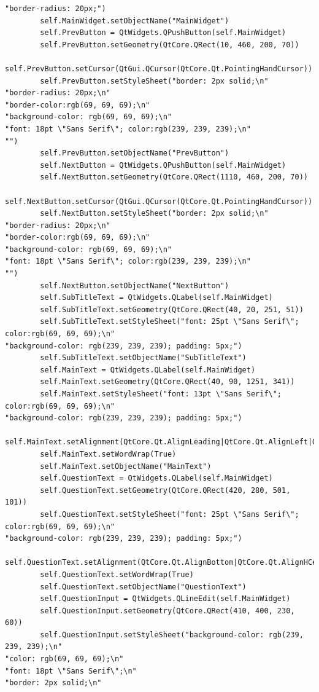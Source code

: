 \documentclass[12pt]{article}
\begin{document}
\begin{lstlisting}
"border-radius: 20px;")
        self.MainWidget.setObjectName("MainWidget")
        self.PrevButton = QtWidgets.QPushButton(self.MainWidget)
        self.PrevButton.setGeometry(QtCore.QRect(10, 460, 200, 70))
        self.PrevButton.setCursor(QtGui.QCursor(QtCore.Qt.PointingHandCursor))
        self.PrevButton.setStyleSheet("border: 2px solid;\n"
"border-radius: 20px;\n"
"border-color:rgb(69, 69, 69);\n"
"background-color: rgb(69, 69, 69);\n"
"font: 18pt \"Sans Serif\"; color:rgb(239, 239, 239);\n"
"")
        self.PrevButton.setObjectName("PrevButton")
        self.NextButton = QtWidgets.QPushButton(self.MainWidget)
        self.NextButton.setGeometry(QtCore.QRect(1110, 460, 200, 70))
        self.NextButton.setCursor(QtGui.QCursor(QtCore.Qt.PointingHandCursor))
        self.NextButton.setStyleSheet("border: 2px solid;\n"
"border-radius: 20px;\n"
"border-color:rgb(69, 69, 69);\n"
"background-color: rgb(69, 69, 69);\n"
"font: 18pt \"Sans Serif\"; color:rgb(239, 239, 239);\n"
"")
        self.NextButton.setObjectName("NextButton")
        self.SubTitleText = QtWidgets.QLabel(self.MainWidget)
        self.SubTitleText.setGeometry(QtCore.QRect(40, 20, 251, 51))
        self.SubTitleText.setStyleSheet("font: 25pt \"Sans Serif\"; color:rgb(69, 69, 69);\n"
"background-color: rgb(239, 239, 239); padding: 5px;")
        self.SubTitleText.setObjectName("SubTitleText")
        self.MainText = QtWidgets.QLabel(self.MainWidget)
        self.MainText.setGeometry(QtCore.QRect(40, 90, 1251, 341))
        self.MainText.setStyleSheet("font: 13pt \"Sans Serif\"; color:rgb(69, 69, 69);\n"
"background-color: rgb(239, 239, 239); padding: 5px;")
        self.MainText.setAlignment(QtCore.Qt.AlignLeading|QtCore.Qt.AlignLeft|QtCore.Qt.AlignTop)
        self.MainText.setWordWrap(True)
        self.MainText.setObjectName("MainText")
        self.QuestionText = QtWidgets.QLabel(self.MainWidget)
        self.QuestionText.setGeometry(QtCore.QRect(420, 280, 501, 101))
        self.QuestionText.setStyleSheet("font: 25pt \"Sans Serif\"; color:rgb(69, 69, 69);\n"
"background-color: rgb(239, 239, 239); padding: 5px;")
        self.QuestionText.setAlignment(QtCore.Qt.AlignBottom|QtCore.Qt.AlignHCenter)
        self.QuestionText.setWordWrap(True)
        self.QuestionText.setObjectName("QuestionText")
        self.QuestionInput = QtWidgets.QLineEdit(self.MainWidget)
        self.QuestionInput.setGeometry(QtCore.QRect(410, 400, 230, 60))
        self.QuestionInput.setStyleSheet("background-color: rgb(239, 239, 239);\n"
"color: rgb(69, 69, 69);\n"
"font: 18pt \"Sans Serif\";\n"
"border: 2px solid;\n"

\end{lstlisting}
\end{document}
